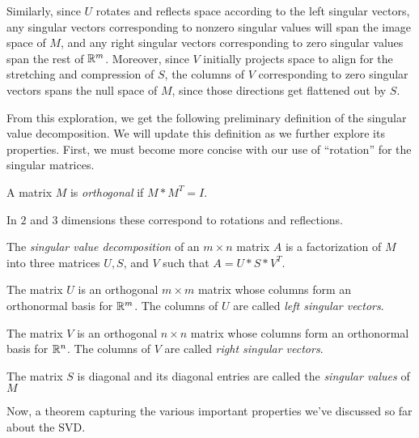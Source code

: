 \documentclass{ximera}
\begin{document}
\begin{problem}
\begin{feedback}
    Similarly, since $U$ rotates and reflects space according to the left singular vectors, any singular vectors corresponding to nonzero singular values will span the image space of $M$, and any right singular vectors corresponding to zero singular values span the rest of $\mathbb{R}^m$. Moreover, since $V$ initially projects space to align for the stretching and compression of $S$, the columns of $V$ corresponding to zero singular vectors spans the null space of $M$, since those directions get flattened out by $S$.

  \end{feedback}

\end{problem}

From this exploration, we get the following preliminary definition of the singular value decomposition. We will update this definition as we further explore its properties. First, we must become more concise with our use of ``rotation'' for the singular matrices.

\begin{definition}

  A matrix $M$ is \emph{orthogonal} if $M*M^T=I$. 

  In $2$ and $3$ dimensions these correspond to rotations and reflections.

\end{definition}

\begin{definition}

  The \emph{singular value decomposition} of an $m\times n$ matrix $A$ is a factorization of $M$ into three matrices $U, S$, and $V$ such that $A=U*S*V^T$.

  The matrix $U$ is an orthogonal $m\times m$ matrix whose columns form an orthonormal basis for $\mathbb{R}^m$. The columns of $U$ are called \emph{left singular vectors}.

  The matrix $V$ is an orthogonal $n\times n$ matrix whose columns form an orthonormal basis for $\mathbb{R}^n$. The columns of $V$ are called \emph{right singular vectors}.

  The matrix $S$ is diagonal and its diagonal entries are called the \emph{singular values} of $M$

\end{definition}

Now, a theorem capturing the various important properties we've discussed so far about the SVD.
\end{document}
